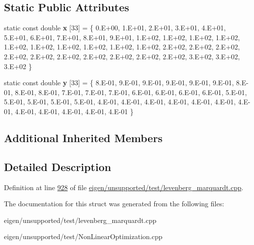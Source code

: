 \subsection*{Static Public Attributes}
\begin{DoxyCompactItemize}
\item 
\mbox{\label{struct_m_g_h17__functor_ad6739ddc5765f1b88fddfdc6e6ab8c02}} 
static const double {\bfseries x} \mbox{[}33\mbox{]} = \{ 0.\+E+00, 1.\+E+01, 2.\+E+01, 3.\+E+01, 4.\+E+01, 5.\+E+01, 6.\+E+01, 7.\+E+01, 8.\+E+01, 9.\+E+01, 1.\+E+02, 1.\+E+02, 1.\+E+02, 1.\+E+02, 1.\+E+02, 1.\+E+02, 1.\+E+02, 1.\+E+02, 1.\+E+02, 1.\+E+02, 2.\+E+02, 2.\+E+02, 2.\+E+02, 2.\+E+02, 2.\+E+02, 2.\+E+02, 2.\+E+02, 2.\+E+02, 2.\+E+02, 2.\+E+02, 3.\+E+02, 3.\+E+02, 3.\+E+02 \}
\item 
\mbox{\label{struct_m_g_h17__functor_a92dd39d24e5d206a2ef67e8a53fb3279}} 
static const double {\bfseries y} \mbox{[}33\mbox{]} = \{ 8.\+E-\/01, 9.\+E-\/01, 9.\+E-\/01, 9.\+E-\/01, 9.\+E-\/01, 9.\+E-\/01, 8.\+E-\/01, 8.\+E-\/01, 8.\+E-\/01, 7.\+E-\/01, 7.\+E-\/01, 7.\+E-\/01, 6.\+E-\/01, 6.\+E-\/01, 6.\+E-\/01, 6.\+E-\/01, 5.\+E-\/01, 5.\+E-\/01, 5.\+E-\/01, 5.\+E-\/01, 5.\+E-\/01, 4.\+E-\/01, 4.\+E-\/01, 4.\+E-\/01, 4.\+E-\/01, 4.\+E-\/01, 4.\+E-\/01, 4.\+E-\/01, 4.\+E-\/01, 4.\+E-\/01, 4.\+E-\/01, 4.\+E-\/01, 4.\+E-\/01 \}
\end{DoxyCompactItemize}
\subsection*{Additional Inherited Members}


\subsection{Detailed Description}


Definition at line \hyperlink{eigen_2unsupported_2test_2levenberg__marquardt_8cpp_source_l00928}{928} of file \hyperlink{eigen_2unsupported_2test_2levenberg__marquardt_8cpp_source}{eigen/unsupported/test/levenberg\+\_\+marquardt.\+cpp}.



The documentation for this struct was generated from the following files\+:\begin{DoxyCompactItemize}
\item 
eigen/unsupported/test/levenberg\+\_\+marquardt.\+cpp\item 
eigen/unsupported/test/\+Non\+Linear\+Optimization.\+cpp\end{DoxyCompactItemize}
